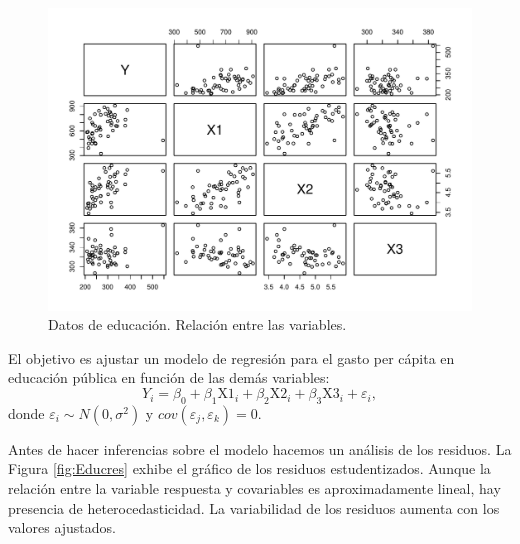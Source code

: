\documentclass[
]{article}
\begin{document}
\begin{figure}

{\centering \includegraphics{MLG1_files/figure-latex/Educdata-1} 

}

\caption{Datos de educación. Relación entre las variables.}\label{fig:Educdata}
\end{figure}

El objetivo es ajustar un modelo de regresión para el gasto per cápita en educación pública en función de las demás variables:
\[
Y_{i} = \beta_{0} + \beta_{1}\mbox{X1}_{i} + \beta_{2}\mbox{X2}_{i}+ \beta_{3}\mbox{X3}_{i} + \varepsilon_{i},
\]
donde \(\varepsilon_{i}\sim N(0,\sigma^{2})\) y \(cov(\varepsilon_{j},\varepsilon_{k})=0\).

Antes de hacer inferencias sobre el modelo hacemos un análisis de los residuos. La Figura \ref{fig:Educres} exhibe el gráfico de los residuos estudentizados. Aunque la relación entre la variable respuesta y covariables es aproximadamente lineal, hay presencia de heterocedasticidad. La variabilidad de los residuos aumenta con los valores ajustados.
\end{document}
